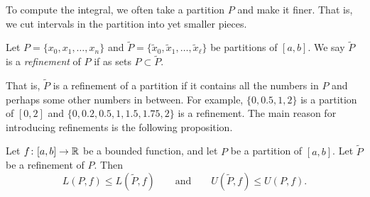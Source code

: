 To compute the integral, we often take a partition $P$ and make it finer.
That is, we cut intervals in the partition into yet smaller pieces.

\begin{defn}
Let $P = \{ x_0, x_1, \ldots, x_n \}$ and
$\widetilde{P} = \{ \widetilde{x}_0, \widetilde{x}_1, \ldots,
\widetilde{x}_{\ell} \}$ be
partitions of $[a,b]$.  We say $\widetilde{P}$ is a
\emph{refinement} of $P$
if as sets $P \subset \widetilde{P}$.
\end{defn}

That is, $\widetilde{P}$ is a refinement of a partition if it contains all the
numbers in $P$ and perhaps some other numbers in between.  For example,
$\{ 0, 0.5, 1, 2 \}$ is a partition of $[0,2]$ and
$\{ 0, 0.2, 0.5, 1, 1.5, 1.75, 2 \}$ is a refinement.
The main reason for introducing refinements is the following proposition.

\begin{prop} \label{prop:refinement}
Let $f \colon [a,b] \to {\mathbb{R}}$ be a bounded function, and let $P$
be a partition of $[a,b]$.  Let $\widetilde{P}$ be a refinement of $P$.
Then
\begin{equation*}
L(P,f) \leq L(\widetilde{P},f) 
\qquad \text{and} \qquad
U(\widetilde{P},f) \leq U(P,f) .
\end{equation*}
\end{prop}

